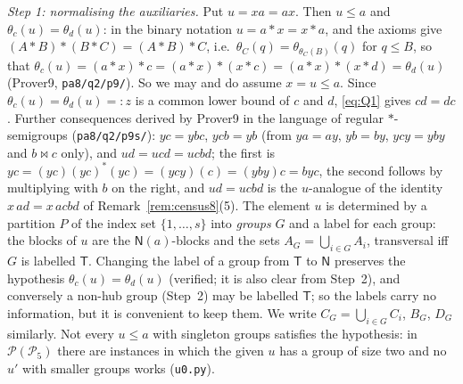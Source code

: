 \documentclass[11pt]{amsart}
\theoremstyle{definition}
\renewcommand{\P}{\mathcal{P}}
\newcommand{\T}{\mathsf{T}}
\newcommand{\N}{\mathsf{N}}
\newcommand{\mt}{\bowtie}   %
\begin{document}
\smallskip
\emph{Step 1: normalising the auxiliaries.} Put $u=xa=ax$. Then $u\le a$ and $\theta_c(u)=\theta_d(u)$: in the binary notation $u=a*x=x*a$, and the axioms give $(A*B)*(B*C)=(A*B)*C$, i.e.\ $\theta_C(q)=\theta_{\theta_C(B)}(q)$ for $q\le B$, so that $\theta_c(u)=(a*x)*c=(a*x)*(x*c)=(a*x)*(x*d)=\theta_d(u)$ (Prover9, \texttt{pa8/q2/p9/}). So we may and do assume $x=u\le a$. Since $\theta_c(u)=\theta_d(u)=:z$ is a common lower bound of $c$ and $d$, \eqref{eq:Q1} gives $cd=dc$. Further consequences derived by Prover9 in the language of regular $*$-semigroups (\texttt{pa8/q2/p9s/}): $yc=ybc$, $ycb=yb$ (from $ya=ay$, $yb=by$, $ycy=yby$ and $b\mt c$ only), and $ud=ucd=ucbd$; the first is $yc=(yc)(yc)^*(yc)=(ycy)(c)=(yby)c=byc$, the second follows by multiplying with $b$ on the right, and $ud=ucbd$ is the $u$-analogue of the identity $x\,ad=x\,acbd$ of Remark~\ref{rem:census8}(5). The element $u$ is determined by a partition $P$ of the index set $\{1,\dots,s\}$ into \emph{groups} $G$ and a label for each group: the blocks of $u$ are the $\N(a)$-blocks and the sets $A_G=\bigcup_{i\in G}A_i$, transversal iff $G$ is labelled $\T$. Changing the label of a group from $\T$ to $\N$ preserves the hypothesis $\theta_c(u)=\theta_d(u)$ (verified; it is also clear from Step~2), and conversely a non-hub group (Step~2) may be labelled $\T$; so the labels carry no information, but it is convenient to keep them. We write $C_G=\bigcup_{i\in G}C_i$, $B_G$, $D_G$ similarly. Not every $u\le a$ with singleton groups satisfies the hypothesis: in $\P(\P_5)$ there are instances in which the given $u$ has a group of size two and no $u'$ with smaller groups works (\texttt{u0.py}).
\end{document}
